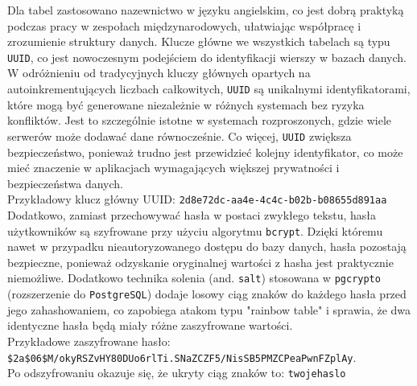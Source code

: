 Dla tabel zastosowano nazewnictwo w języku angielskim, co jest dobrą praktyką podczas pracy w zespołach międzynarodowych, ułatwiając współpracę i zrozumienie struktury danych. Klucze główne we wszystkich tabelach są typu \texttt{UUID}, co jest nowoczesnym podejściem do identyfikacji wierszy w bazach danych. W odróżnieniu od tradycyjnych kluczy głównych opartych na autoinkrementujących liczbach całkowitych, \texttt{UUID} są unikalnymi identyfikatorami, które mogą być generowane niezależnie w różnych systemach bez ryzyka konfliktów. Jest to szczególnie istotne w systemach rozproszonych, gdzie wiele serwerów może dodawać dane równocześnie. Co więcej, \texttt{UUID} zwiększa bezpieczeństwo, ponieważ trudno jest przewidzieć kolejny identyfikator, co może mieć znaczenie w aplikacjach wymagających większej prywatności i bezpieczeństwa danych. \\
Przykładowy klucz główny UUID: \texttt{2d8e72dc-aa4e-4c4c-b02b-b08655d891aa} \\

Dodatkowo, zamiast przechowywać hasła w postaci zwykłego tekstu, hasła użytkowników są szyfrowane przy użyciu algorytmu \texttt{bcrypt}. Dzięki któremu nawet w przypadku nieautoryzowanego dostępu do bazy danych, hasła pozostają bezpieczne, ponieważ odzyskanie oryginalnej wartości z hasha jest praktycznie niemożliwe. Dodatkowo technika solenia (and. \texttt{salt}) stosowana w \texttt{pgcrypto} (rozszerzenie do \texttt{PostgreSQL}) dodaje losowy ciąg znaków do każdego hasła przed jego zahashowaniem, co zapobiega atakom typu "rainbow table" i sprawia, że dwa identyczne hasła będą miały różne zaszyfrowane wartości. \\
Przykładowe zaszyfrowane hasło: \\
\texttt{\$2a\$06\$M/okyRSZvHY80DUo6rlTi.SNaZCZF5/NisSB5PMZCPeaPwnFZplAy}. \\
Po odszyfrowaniu okazuje się, że ukryty ciąg znaków to: \texttt{twojehaslo}
